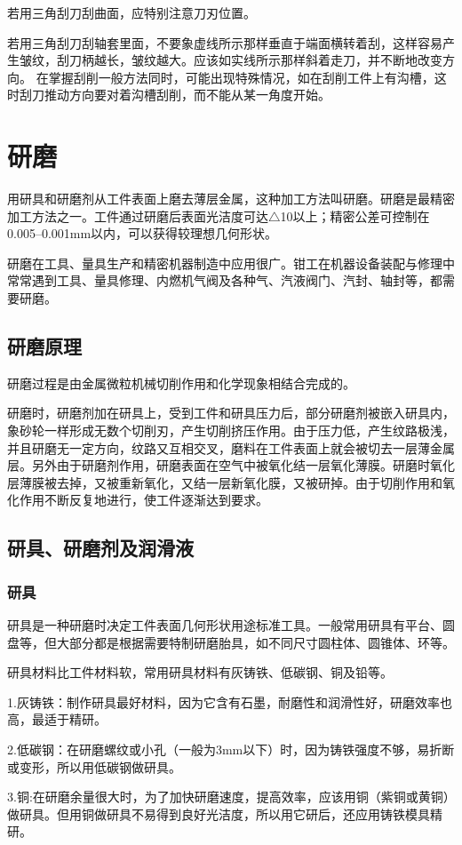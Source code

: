 \documentclass{ctexbook}
\begin{document}
若用三角刮刀刮曲面，应特别注意刀刃位置。

若用三角刮刀刮轴套里面，不要象虚线所示那样垂直于端面横转着刮，这样容易产生皱纹，刮刀柄越长，皱纹越大。应该如实线所示那样斜着走刀，并不断地改变方向。
在掌握刮削一般方法同时，可能出现特殊情况，如在刮削工件上有沟槽，这时刮刀推动方向要对着沟槽刮削，而不能从某一角度开始。
\section{研磨}
用研具和研磨剂从工件表面上磨去薄层金属，这种加工方法叫研磨。研磨是最精密加工方法之一。工件通过研磨后表面光洁度可达$\bigtriangleup$10以上；精密公差可控制在0.005--0.001mm以内，可以获得较理想几何形状。

研磨在工具、量具生产和精密机器制造中应用很广。钳工在机器设备装配与修理中常常遇到工具、量具修理、内燃机气阀及各种气、汽液阀门、汽封、轴封等，都需要研磨。
\subsection{研磨原理}
研磨过程是由金属微粒机械切削作用和化学现象相结合完成的。

研磨时，研磨剂加在研具上，受到工件和研具压力后，部分研磨剂被嵌入研具内，象砂轮一样形成无数个切削刃，产生切削挤压作用。由于压力低，产生纹路极浅，并且研磨无一定方向，纹路又互相交叉，磨料在工件表面上就会被切去一层薄金属层。另外由于研磨剂作用，研磨表面在空气中被氧化结一层氧化薄膜。研磨时氧化层薄膜被去掉，又被重新氧化，又结一层新氧化膜，又被研掉。由于切削作用和氧化作用不断反复地进行，使工件逐渐达到要求。
\subsection{研具、研磨剂及润滑液}
\subsubsection{研具}
研具是一种研磨时决定工件表面几何形状用途标准工具。一般常用研具有平台、圆盘等，但大部分都是根据需要特制研磨胎具，如不同尺寸圆柱体、圆锥体、环等。

研具材料比工件材料软，常用研具材料有灰铸铁、低碳钢、铜及铅等。

1.灰铸铁：制作研具最好材料，因为它含有石墨，耐磨性和润滑性好，研磨效率也高，最适于精研。

2.低碳钢：在研磨螺纹或小孔（一般为3mm以下）时，因为铸铁强度不够，易折断或变形，所以用低碳钢做研具。

3.铜:在研磨余量很大时，为了加快研磨速度，提高效率，应该用铜（紫铜或黄铜）做研具。但用铜做研具不易得到良好光洁度，所以用它研后，还应用铸铁模具精研。
\end{document}
